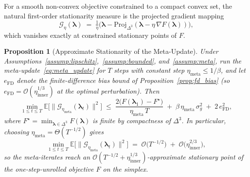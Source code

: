 \documentclass[10pt]{article}
\theoremstyle{plain}
\newtheorem{proposition}{Proposition}
\theoremstyle{definition}
\begin{document}
For a smooth non-convex objective constrained to a compact convex set, the natural first-order stationarity measure is the projected gradient mapping
\begin{equation}
\mathcal{G}_{\eta}(\boldsymbol{\lambda}) \;=\; \tfrac{1}{\eta}\big(\boldsymbol{\lambda}-\mathrm{Proj}_{\Delta^{3}}(\boldsymbol{\lambda}-\eta\,\nabla F(\boldsymbol{\lambda}))\big),
\label{eq:grad_mapping}
\end{equation}
which vanishes exactly at constrained stationary points of $F$.

\begin{proposition}[Approximate Stationarity of the Meta-Update]
\label{prop:meta_stationarity}
Under Assumptions~\ref{assump:lipschitz},~\ref{assump:bounded}, and~\ref{assump:meta}, run the meta-update~\eqref{eq:meta_update} for $T$ steps with constant step $\eta_{\mathrm{meta}}\le 1/\beta$, and let $e_{\mathrm{FD}}$ denote the finite-difference bias bound of Proposition~\ref{prop:fd_bias} (so $e_{\mathrm{FD}}=\mathcal{O}(\eta_{\mathrm{inner}}^{1/3})$ at the optimal perturbation). Then
\begin{equation}
\min_{1\le t\le T}\mathbb{E}\big[\|\mathcal{G}_{\eta_{\mathrm{meta}}}(\boldsymbol{\lambda}_t)\|^{2}\big]
\;\le\;
\frac{2\big(F(\boldsymbol{\lambda}_1)-F^{\star}\big)}{\eta_{\mathrm{meta}}\,T}
\;+\;
\beta\,\eta_{\mathrm{meta}}\,\sigma_g^{2}
\;+\;
2\,e_{\mathrm{FD}}^{2},
\label{eq:stationarity}
\end{equation}
where $F^{\star}=\min_{\boldsymbol{\lambda}\in\Delta^{3}}F(\boldsymbol{\lambda})$ is finite by compactness of $\Delta^{3}$. In particular, choosing $\eta_{\mathrm{meta}}=\Theta(T^{-1/2})$ gives
\[
\min_{1\le t\le T}\mathbb{E}\big[\|\mathcal{G}_{\eta_{\mathrm{meta}}}(\boldsymbol{\lambda}_t)\|^{2}\big]
\;=\;\mathcal{O}\!\big(T^{-1/2}\big)\;+\;\mathcal{O}\!\big(\eta_{\mathrm{inner}}^{2/3}\big),
\]
so the meta-iterates reach an $\mathcal{O}(T^{-1/2}+\eta_{\mathrm{inner}}^{1/3})$-approximate stationary point of the one-step-unrolled objective $F$ on the simplex.
\end{proposition}
\end{document}
